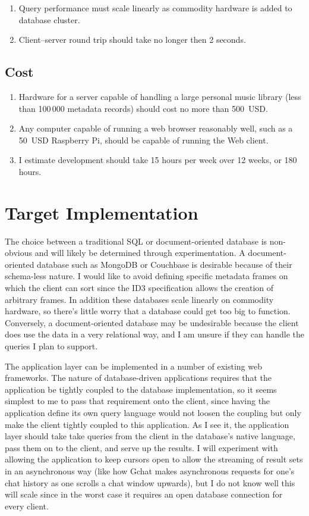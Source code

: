 \documentclass{abrice}
\begin{document}
\begin{enumerate}
\item Query performance must scale linearly as commodity hardware is added to
  database cluster.
\item Client--server round trip should take no longer then 2 seconds.
\end{enumerate}

\subsection{Cost}

\begin{enumerate}
\item Hardware for a server capable of handling a large personal music library
  (less than 100\,000 metadata records) should cost no more than 500~USD.
\item Any computer capable of running a web browser reasonably well, such as a 50~USD
  Raspberry Pi, should be capable of running the Web client.
\item I estimate development should take 15 hours per week over 12 weeks, or 180 hours.
\end{enumerate}

\section{Target Implementation}

The choice between a traditional SQL or document-oriented database is
non-obvious and will likely be determined through experimentation. A
document-oriented database such as MongoDB or Couchbase is desirable because of
their schema-less nature. I would like to avoid defining specific metadata
frames on which the client can sort since the ID3 specification allows the
creation of arbitrary frames. In addition these databases scale linearly on
commodity hardware, so there's little worry that a database could get too big to
function. Conversely, a document-oriented database may be undesirable because
the client does use the data in a very relational way, and I am unsure if they
can handle the queries I plan to support.

The application layer can be implemented in a number of existing web
frameworks. The nature of database-driven applications requires that the
application be tightly coupled to the database implementation, so it seems
simplest to me to pass that requirement onto the client, since having the
application define its own query language would not loosen the coupling but only
make the client tightly coupled to this application. As I see it, the
application layer should take take queries from the client in the database's
native language, pass them on to the client, and serve up the results. I will
experiment with allowing the application to keep cursors open to allow the
streaming of result sets in an asynchronous way (like how Gchat makes
asynchronous requests for one's chat history as one scrolls a chat window
upwards), but I do not know well this will scale since in the worst case it
requires an open database connection for every client.
\end{document}
